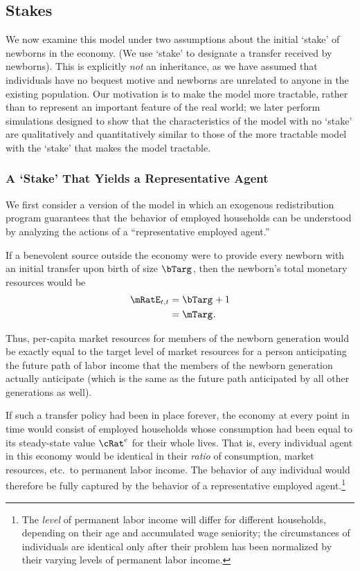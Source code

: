 \documentclass{handout}
\begin{document}
\subsection{Stakes}

We now examine this model under two assumptions about the initial
`stake' of newborns in the economy.  (We use `stake' to designate a
transfer received by newborns).  This is explicitly {\it not} an
inheritance, as we have assumed that individuals have no bequest
motive and newborns are unrelated to anyone in the existing
population.  Our motivation is to make the model more tractable,
rather than to represent an important feature of the real world; we
later perform simulations designed to show that the characteristics of
the model with no `stake' are qualitatively and quantitatively similar
to those of the more tractable model with the `stake' that makes the
model tractable.

\subsubsection{A `Stake' That Yields a Representative Agent}

We first consider a version of the model in which an exogenous
redistribution program guarantees that the behavior of employed households can 
be understood by analyzing the actions of a ``representative employed agent.''  

If a benevolent source outside the economy were to provide every newborn with an initial
transfer upon birth of size $\bTarg^{\null}$, then the newborn's total monetary resources 
would be
\begin{equation*}\begin{gathered}\begin{aligned}
  \mRatE_{t,t} & =  \bTarg^{\null} + 1
\\ & =  \mTarg^{\null} 
.
\end{aligned}\end{gathered}\end{equation*}

Thus, per-capita market resources for members of the newborn generation
would be exactly equal to the target level of market resources for a
person anticipating the future path of labor income that the members of the newborn
generation actually anticipate (which is the same as the future path
anticipated by all other generations as well).

If such a transfer policy had been in place forever, the economy at every 
point in time would consist of employed households whose consumption had 
been equal to its steady-state value ${\cRat}^{e}$ for their whole lives.  That is, every 
individual agent in this economy would be identical in their {\it ratio} of consumption,
market resources, etc.\ to permanent labor income.  
The behavior of any individual would therefore be fully captured by the behavior
of a representative employed agent.\footnote{The {\it level} of permanent 
labor income will differ for different households, depending on their age
and accumulated wage seniority; the circumstances of individuals are identical
only after their problem has been normalized by their varying levels of permanent 
labor income.}
\end{document}
